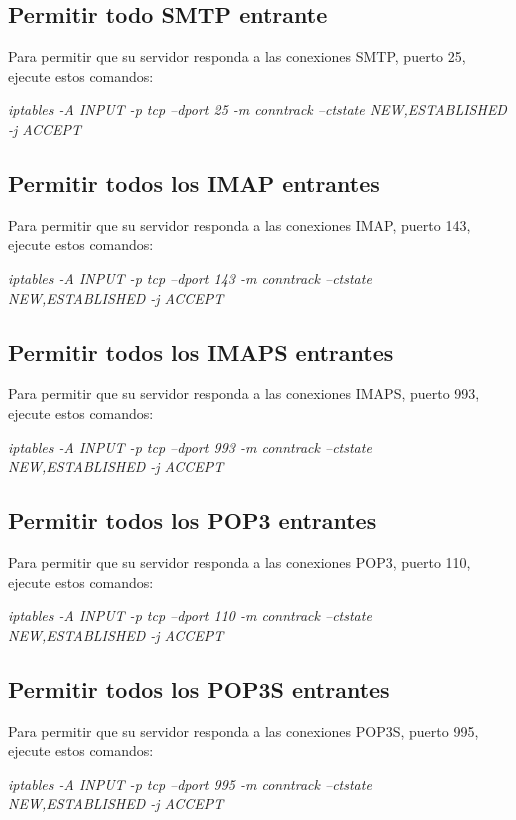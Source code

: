\documentclass{article}
\begin{document}
\subsection*{Permitir todo SMTP entrante}
Para permitir que su servidor responda a las conexiones SMTP, puerto 25, ejecute estos comandos:

 \begin{center}
 	\textit{iptables -A INPUT -p tcp --dport 25 -m conntrack --ctstate NEW,ESTABLISHED -j ACCEPT}
 \end{center}

\subsection*{Permitir todos los IMAP entrantes}
Para permitir que su servidor responda a las conexiones IMAP, puerto 143, ejecute estos comandos:

\begin{center}
	\textit{ iptables -A INPUT -p tcp --dport 143 -m conntrack --ctstate NEW,ESTABLISHED -j ACCEPT}
\end{center}
\subsection*{Permitir todos los IMAPS entrantes}
Para permitir que su servidor responda a las conexiones IMAPS, puerto 993, ejecute estos comandos:

\begin{center}
	\textit{ iptables -A INPUT -p tcp --dport 993 -m conntrack --ctstate NEW,ESTABLISHED -j ACCEPT}
\end{center}
\subsection*{Permitir todos los POP3 entrantes}
Para permitir que su servidor responda a las conexiones POP3, puerto 110, ejecute estos comandos:
\begin{center}
	\textit{ iptables -A INPUT -p tcp --dport 110 -m conntrack --ctstate NEW,ESTABLISHED -j ACCEPT}
\end{center}

\subsection*{Permitir todos los POP3S entrantes}
Para permitir que su servidor responda a las conexiones POP3S, puerto 995, ejecute estos comandos:

\begin{center}
	\textit{ iptables -A INPUT -p tcp --dport 995 -m conntrack --ctstate NEW,ESTABLISHED -j ACCEPT}
\end{center}
\end{document}
